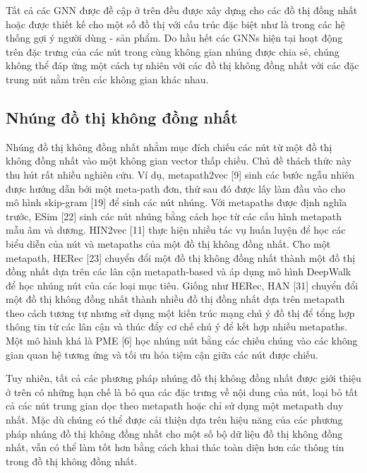 Tất cả các GNN được đề cập ở trên đều được xây dựng cho các đồ thị đồng nhất hoặc được thiết kế cho một số đồ thị với cấu trúc đặc biệt như là trong các hệ thống gợi ý người dùng - sản phẩm. Do hầu hết các GNNs hiện tại hoạt động trên đặc trưng của các nút trong cùng không gian nhúng được chia sẻ, chúng không thể đáp ứng một cách tự nhiên với các đồ thị không đồng nhất với các đặc trung nút nằm trên các không gian khác nhau.

\subsection[short]{Nhúng đồ thị không đồng nhất}
Nhúng đồ thị không đồng nhất nhằm mục đích chiếu các nút từ một đồ thị không đồng nhất vào một không gian vector thấp chiều. Chủ đề thách thức này thu hút rất nhiều nghiên cứu. Ví dụ, metapath2vec [9] sinh các bước ngẫu nhiên được hướng dẫn bởi một meta-path đơn, thứ sau đó được lấy làm đầu vào cho mô hình skip-gram [19] để sinh các nút nhúng. Với metapaths được định nghĩa trước, ESim [22] sinh các nút nhúng bằng cách học từ các cấu hình metapath mẫu âm và dương. HIN2vec [11] thực hiện nhiều tác vụ huấn luyện để học các biểu diễn của nút và metapaths của một đồ thị không đồng nhất. Cho một metapath, HERec [23] chuyển đổi một đồ thị không đồng nhất thành một đồ thị đồng nhất dựa trên các lân cận metapath-based và áp dụng mô hình DeepWalk  để học nhúng nút của các loại mục tiêu. Giống như HERec, HAN [31] chuyển đổi một đồ thị không đồng nhất thành nhiều đồ thị đồng nhất dựa trên metapath theo cách tương tự nhưng sử dụng một kiến trúc mạng chú ý đồ thị để tổng hợp thông tin từ các lân cận và thúc đẩy cơ chế chú ý để kết hợp nhiều metapaths. Một mô hình khá là PME [6] học nhúng nút bằng các chiếu chúng vào các không gian quan hệ tương ứng và tối ưu hóa tiệm cận giữa các nút được chiếu.

Tuy nhiên, tất cả các phương pháp nhúng đồ thị không đồng nhất được giới thiệu ở trên có những hạn chế là bỏ qua các đặc trưng về nội dung của nút, loại bỏ tất cả các nút trung gian dọc theo metapath hoặc chỉ sử dụng một metapath duy nhất. Mặc dù chúng có thể được cải thiện dựa trên hiệu năng của các phương pháp nhúng đồ thị không đồng nhất cho một số bộ dữ liệu đồ thị không đồng nhất, vẫn có thể làm tốt hơn bằng cách khai thác toàn diện hơn các thông tin trong đồ thị không đồng nhất. 